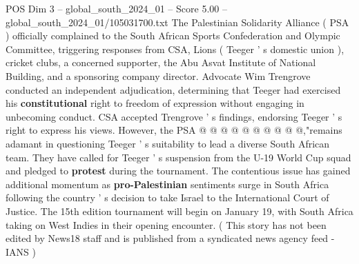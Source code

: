 \begin{textsample}{POS Dim 3 – global\_south\_2024\_01 – Score 5.00 – global\_south\_2024\_01/105031700.txt}
The Palestinian Solidarity Alliance ( PSA ) officially complained to the South African Sports Confederation and Olympic Committee, triggering responses from CSA, Lions ( Teeger ' s domestic union ), cricket clubs, a concerned supporter, the Abu Asvat Institute of National Building, and a sponsoring company director.
Advocate Wim Trengrove conducted an independent adjudication, determining that Teeger had exercised his \textbf{constitutional} right to freedom of expression without engaging in unbecoming conduct.
CSA accepted Trengrove ' s findings, endorsing Teeger ' s right to express his views.
However, the PSA @ @ @ @ @ @ @ @ @ @,"remains adamant in questioning Teeger ' s suitability to lead a diverse South African team.
They have called for Teeger ' s suspension from the U-19 World Cup squad and pledged to \textbf{protest} during the tournament.
The contentious issue has gained additional momentum as \textbf{pro-Palestinian} sentiments surge in South Africa following the country ' s decision to take Israel to the International Court of Justice.
The 15th edition tournament will begin on January 19, with South Africa taking on West Indies in their opening encounter. ( This story has not been edited by News18 staff and is published from a syndicated news agency feed - IANS )

\end{textsample}
